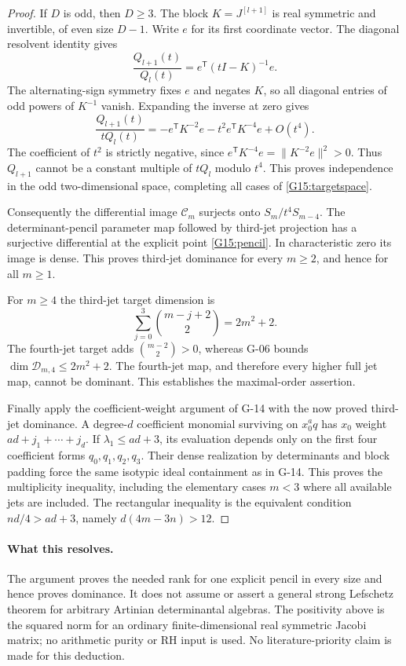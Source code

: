 \begin{proof}
If $D$ is odd, then $D\geq3$. The block
$K=J^{[l+1]}$ is real symmetric and invertible,
of even size $D-1$. Write $e$ for its first
coordinate vector. The diagonal resolvent identity gives
\[
 \frac{Q_{l+1}(t)}{Q_l(t)}
    =e^{\mathsf T}(tI-K)^{-1}e.
\]
The alternating-sign symmetry fixes $e$ and negates
$K$, so all diagonal entries of odd powers of
$K^{-1}$ vanish. Expanding the inverse at zero gives
\[
 \frac{Q_{l+1}(t)}{tQ_l(t)}
   =-e^{\mathsf T}K^{-2}e
     -t^2 e^{\mathsf T}K^{-4}e
     +O(t^4).
\]
The coefficient of $t^2$ is strictly negative, since
$e^{\mathsf T}K^{-4}e=\|K^{-2}e\|^2>0$. Thus
$Q_{l+1}$ cannot be a constant multiple of $tQ_l$
modulo $t^4$. This proves independence in the odd
two-dimensional space, completing all cases of
\eqref{G15:targetspace}.

Consequently the differential image $\mathcal C_m$
surjects onto $S_m/t^4S_{m-4}$. The determinant-pencil
parameter map followed by third-jet projection has a
surjective differential at the explicit point
\eqref{G15:pencil}. In characteristic zero its image
is dense. This proves third-jet dominance for every
$m\geq2$, and hence for all $m\geq1$.

For $m\geq4$ the third-jet target dimension is
\[
 \sum_{j=0}^3\binom{m-j+2}{2}=2m^2+2.
\]
The fourth-jet target adds
$\binom{m-2}{2}>0$, whereas G-06 bounds
$\dim\mathcal D_{m,4}\leq2m^2+2$. The fourth-jet
map, and therefore every higher full jet map, cannot
be dominant. This establishes the maximal-order
assertion.

Finally apply the coefficient-weight argument of
G-14 with the now proved third-jet dominance. A
degree-$d$ coefficient monomial surviving on
$x_0^a q$ has $x_0$ weight
$ad+j_1+\cdots+j_d$. If $\lambda_1\leq ad+3$,
its evaluation depends only on the first four
coefficient forms $q_0,q_1,q_2,q_3$. Their dense
realization by determinants and block padding force
the same isotypic ideal containment as in G-14.
This proves the multiplicity inequality, including
the elementary cases $m<3$ where all available
jets are included. The rectangular inequality is
the equivalent condition
$nd/4>ad+3$, namely $d(4m-3n)>12$.
\end{proof}

\paragraph{What this resolves.}
The argument proves the needed rank for one explicit
pencil in every size and hence proves dominance. It
does not assume or assert a general strong Lefschetz
theorem for arbitrary Artinian determinantal algebras.
The positivity above is the squared norm for an
ordinary finite-dimensional real symmetric Jacobi
matrix; no arithmetic purity or RH input is used.
No literature-priority claim is made for this deduction.

